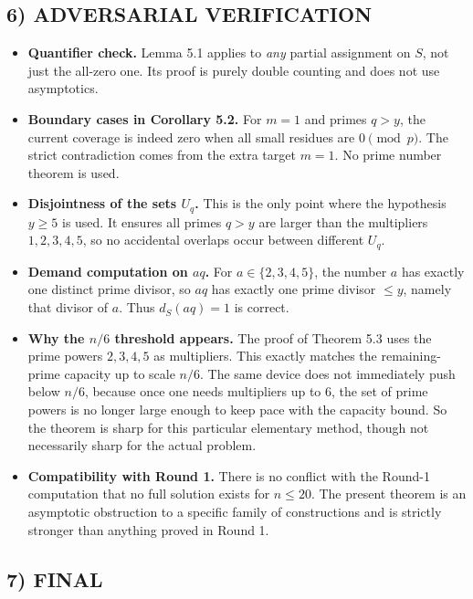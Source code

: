 \subsection*{6) ADVERSARIAL VERIFICATION}

\begin{itemize}
\item \textbf{Quantifier check.}
Lemma 5.1 applies to \emph{any} partial assignment on \(S\), not just the all-zero one. Its proof is purely double counting and does not use asymptotics.

\item \textbf{Boundary cases in Corollary 5.2.}
For \(m=1\) and primes \(q>y\), the current coverage is indeed zero when all small residues are \(0\pmod p\).
The strict contradiction comes from the extra target \(m=1\).
No prime number theorem is used.

\item \textbf{Disjointness of the sets \(U_q\).}
This is the only point where the hypothesis \(y\ge 5\) is used.
It ensures all primes \(q>y\) are larger than the multipliers \(1,2,3,4,5\), so no accidental overlaps occur between different \(U_q\).

\item \textbf{Demand computation on \(aq\).}
For \(a\in\{2,3,4,5\}\), the number \(a\) has exactly one distinct prime divisor, so \(aq\) has exactly one prime divisor \(\le y\), namely that divisor of \(a\).
Thus \(d_S(aq)=1\) is correct.

\item \textbf{Why the \(n/6\) threshold appears.}
The proof of Theorem 5.3 uses the prime powers \(2,3,4,5\) as multipliers.
This exactly matches the remaining-prime capacity up to scale \(n/6\).
The same device does not immediately push below \(n/6\), because once one needs multipliers up to \(6\), the set of prime powers is no longer large enough to keep pace with the capacity bound.
So the theorem is sharp for this particular elementary method, though not necessarily sharp for the actual problem.

\item \textbf{Compatibility with Round 1.}
There is no conflict with the Round-1 computation that no full solution exists for \(n\le 20\).
The present theorem is an asymptotic obstruction to a specific family of constructions and is strictly stronger than anything proved in Round 1.
\end{itemize}

\subsection*{7) FINAL}

